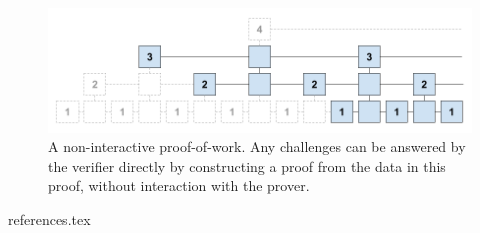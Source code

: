 \documentclass[11pt]{llncs}
\begin{document}
\begin{figure}[h]
    \caption{A non-interactive proof-of-work. Any challenges can be answered by
    the verifier directly by constructing a proof from the data in this proof,
    without interaction with the prover.}
    \centering
    \includegraphics[width=\textwidth,keepaspectratio]{figures/non-interactive-popow.png}
\end{figure}

{references.tex}
\end{document}
